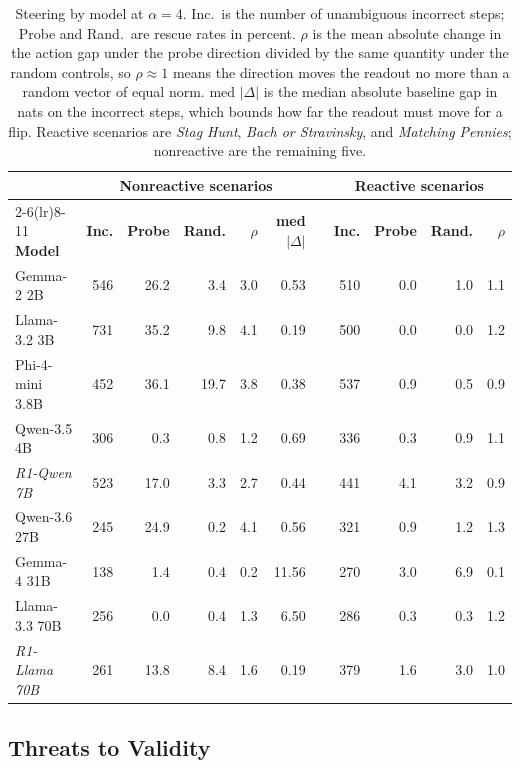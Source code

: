 \begin{table}[t]
\centering
\small
\setlength{\tabcolsep}{5pt}
\begin{tabular}{@{}lrrrrrcrrrr@{}}
\toprule
&
\multicolumn{5}{c}{\textbf{Nonreactive scenarios}}
&
&
\multicolumn{4}{c}{\textbf{Reactive scenarios}}
\\
\cmidrule(lr){2-6}\cmidrule(lr){8-11}
\textbf{Model}
& \textbf{Inc.} & \textbf{Probe} & \textbf{Rand.} & \(\rho\) & \textbf{med} \(|\Delta|\)
&
& \textbf{Inc.} & \textbf{Probe} & \textbf{Rand.} & \(\rho\)
\\
\midrule
Gemma-2 2B      & 546 & 26.2 &  3.4 & 3.0 &  0.53 && 510 & 0.0 & 1.0 & 1.1 \\
Llama-3.2 3B    & 731 & 35.2 &  9.8 & 4.1 &  0.19 && 500 & 0.0 & 0.0 & 1.2 \\
Phi-4-mini 3.8B & 452 & 36.1 & 19.7 & 3.8 &  0.38 && 537 & 0.9 & 0.5 & 0.9 \\
Qwen-3.5 4B     & 306 &  0.3 &  0.8 & 1.2 &  0.69 && 336 & 0.3 & 0.9 & 1.1 \\
\textit{R1-Qwen 7B}   & 523 & 17.0 &  3.3 & 2.7 &  0.44 && 441 & 4.1 & 3.2 & 0.9 \\
Qwen-3.6 27B    & 245 & 24.9 &  0.2 & 4.1 &  0.56 && 321 & 0.9 & 1.2 & 1.3 \\
Gemma-4 31B     & 138 &  1.4 &  0.4 & 0.2 & 11.56 && 270 & 3.0 & 6.9 & 0.1 \\
Llama-3.3 70B   & 256 &  0.0 &  0.4 & 1.3 &  6.50 && 286 & 0.3 & 0.3 & 1.2 \\
\textit{R1-Llama 70B} & 261 & 13.8 &  8.4 & 1.6 &  0.19 && 379 & 1.6 & 3.0 & 1.0 \\
\bottomrule
\end{tabular}
\caption{Steering by model at \(\alpha=4\). Inc.\ is the number of unambiguous
incorrect steps; Probe and Rand.\ are rescue rates in percent.
\(\rho\) is the mean absolute change in the action gap under the probe
direction divided by the same quantity under the random controls, so
\(\rho\approx1\) means the direction moves the readout no more than a random
vector of equal norm. med \(|\Delta|\) is the median absolute baseline gap in
nats on the incorrect steps, which bounds how far the readout must move for a
flip. Reactive scenarios are \textit{Stag Hunt}, \textit{Bach or Stravinsky},
and \textit{Matching Pennies}; nonreactive are the remaining five.}
\label{tab:steer-model}
\end{table}

\subsection{Threats to Validity}

